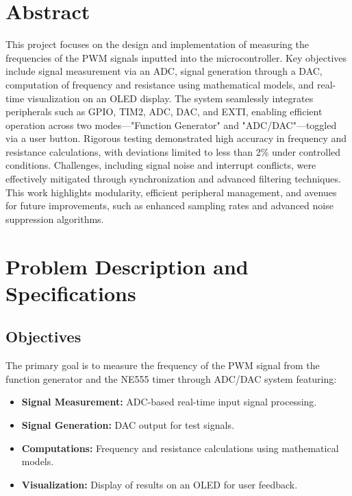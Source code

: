 \documentclass[12pt]{article}
\begin{document}


\tableofcontents
\newpage

\section*{Abstract}
This project focuses on the design and implementation of measuring the frequencies of the PWM signals inputted into the microcontroller. Key objectives include signal measurement via an ADC, signal generation through a DAC, computation of frequency and resistance using mathematical models, and real-time visualization on an OLED display. The system seamlessly integrates peripherals such as GPIO, TIM2, ADC, DAC, and EXTI, enabling efficient operation across two modes—"Function Generator" and "ADC/DAC"—toggled via a user button. Rigorous testing demonstrated high accuracy in frequency and resistance calculations, with deviations limited to less than 2\% under controlled conditions. Challenges, including signal noise and interrupt conflicts, were effectively mitigated through synchronization and advanced filtering techniques. This work highlights modularity, efficient peripheral management, and avenues for future improvements, such as enhanced sampling rates and advanced noise suppression algorithms.

\section{Problem Description and Specifications}
\subsection{Objectives}
The primary goal is to measure the frequency of the PWM signal from the function generator and the NE555 timer through ADC/DAC system featuring:
\begin{itemize}[leftmargin=2em]
    \item \textbf{Signal Measurement:} ADC-based real-time input signal processing.
    \item \textbf{Signal Generation:} DAC output for test signals.
    \item \textbf{Computations:} Frequency and resistance calculations using mathematical models.
    \item \textbf{Visualization:} Display of results on an OLED for user feedback.
\end{itemize}
\end{document}
